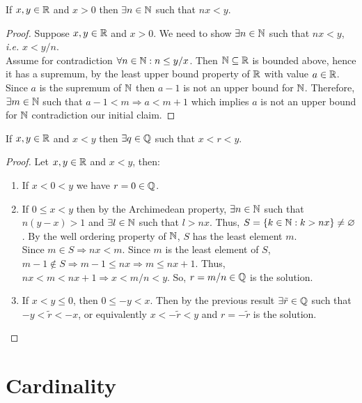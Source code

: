 \begin{theorem}
    If $x, y \in \mathbb{R}$ and $x > 0$ then $\exists n \in \mathbb{N}$ such that $nx < y$.
\end{theorem}

\begin{proof}
    Suppose $x, y \in \mathbb{R}$ and $x > 0$. We need to show $\exists n \in \mathbb{N}$ such that $nx < y$, \emph{i.e.} $x < y/n$. \\
    Assume for contradiction $\forall n \in \mathbb{N}: n \leq y/x$. Then $\mathbb{N} \subseteq \mathbb{R}$ is bounded above, hence it has a supremum, by the least upper bound property of $\R$ with value $a \in \mathbb{R}$. Since $a$ is the supremum of $\mathbb{N}$ then $a-1$ is not an upper bound for $\mathbb{N}$. Therefore, $\exists m \in \mathbb{N}$ such that $a-1 < m \Rightarrow a < m + 1$ which implies $a$ is not an upper bound for $\mathbb{N}$ contradiction our initial claim.
\end{proof}

\begin{theorem}[Densit of $\Q$ in $\R$]
    If $x, y \in \mathbb{R}$ and $x < y$ then $\exists q \in \mathbb{Q}$ such that $x < r < y$.
\end{theorem}

\begin{proof}
    Let $x, y \in \mathbb{R}$ and $x < y$, then:
    \begin{enumerate}
        \item If $x < 0 < y$ we have $r = 0 \in \mathbb{Q}$.
        \item If $0 \leq x < y$ then by the Archimedean property, $\exists n \in \mathbb{N}$ such that $n(y-x) > 1$ and $\exists l \in \mathbb{N}$ such that $l > nx$. Thus, $S = \{ k \in \mathbb{N}: k > nx\} \neq \varnothing$. By the well ordering property of $\mathbb{N}$, $S$ has the least element $m$.\\
        Since $m \in S \Rightarrow nx < m$. Since $m$ is the least element of $S$, $m-1 \notin S \Rightarrow m-1 \leq nx \Rightarrow m \leq nx + 1$. Thus, $nx < m < nx + 1 \Rightarrow x < m/n < y$. So, $r = m/n \in \mathbb{Q}$ is the solution.
        \item If $x < y \leq 0$, then $0 \leq -y < x$. Then by the previous result $\exists \tilde{r} \in \mathbb{Q}$ such that $-y < \tilde{r} < -x$, or equivalently $x < -\tilde{r} < y$ and $r = -\tilde{r}$ is the solution.
    \end{enumerate}
\end{proof}

\section{Cardinality}

